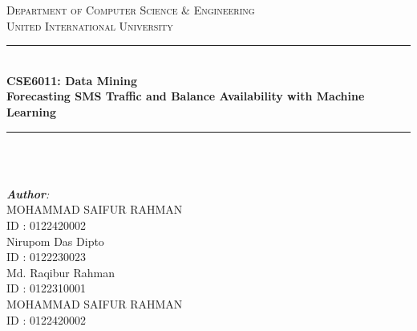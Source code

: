 \documentclass[12pt]{report} %
\begin{document}
\begin{titlepage}

\newcommand{\HRule}{\rule{\linewidth}{0.5mm}} %
\center %
 

\textsc{\Large Department of Computer Science \& Engineering}\\[0.5cm] %
\textsc{\Huge United International University}\\[1cm] %


\HRule \\[0.4cm]
{ \huge \LARGE \textbf{CSE6011: Data Mining}}\\ [0.4cm] %
{ {\Large \textbf{Forecasting SMS Traffic and Balance Availability with Machine Learning}}}\\
\HRule \\
\\[1cm]

\begin{minipage}{0.5\textwidth}
\begin{flushleft} \small
\emph{\textbf{\large Author}:}\\
MOHAMMAD SAIFUR RAHMAN  \\ %
ID : 0122420002\\
Nirupom Das Dipto  \\ %
ID : 0122230023\\
Md. Raqibur Rahman  \\ %
ID : 0122310001\\
MOHAMMAD SAIFUR RAHMAN  \\ %
ID : 0122420002\\


\end{flushleft}
\end{minipage}
\end{titlepage}
\end{document}
